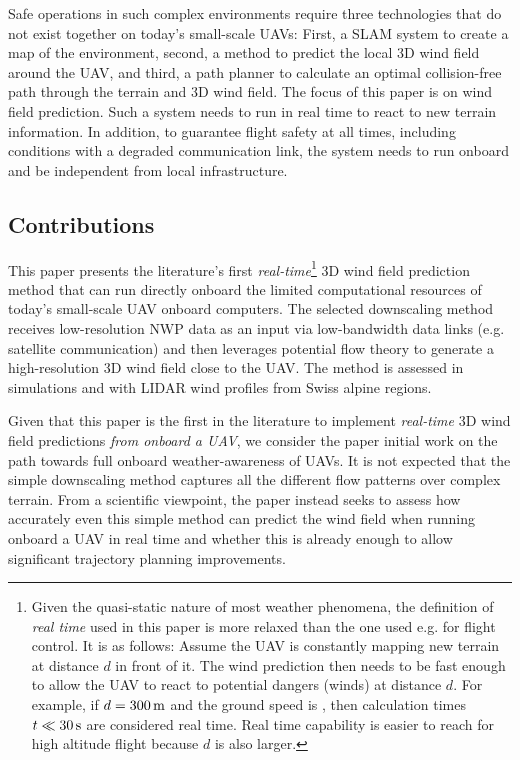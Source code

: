 \documentclass[twocolumn,letterpaper]{IEEEAerospaceCLS}
\begin{document}
Safe operations in such complex environments require three technologies that do not exist together on today's small-scale UAVs: First, a \ac{SLAM} system to create a map of the environment, second, a method to predict the local 3D wind field around the \ac{UAV}, and third, a path planner to calculate an optimal collision-free path through the terrain and 3D wind field. The focus of this paper is on wind field prediction. Such a system needs to run in real time to react to new terrain information. In addition, to guarantee flight safety at all times, including conditions with a degraded communication link, the system needs to run onboard and be independent from local infrastructure.

\subsection{Contributions}
\label{sec:PL_Intro_Contributions}

This paper presents the literature's first \emph{real-time}\footnote{Given the quasi-static nature of most weather phenomena, the definition of \emph{real time} used in this paper is more relaxed than the one used e.g. for flight control. It is as follows: Assume the UAV is constantly mapping new terrain at distance $d$ in front of it. The wind prediction then needs to be fast enough to allow the UAV to react to potential dangers (winds) at distance $d$. For example, if $d=\unit[300]{m}$ and the ground speed is , then calculation times $t\ll\unit[30]{s}$ are considered real time. Real time capability is easier to reach for high altitude flight because $d$ is also larger.} 3D wind field prediction method that can run directly onboard the limited computational resources of today's small-scale \ac{UAV} onboard computers. The selected downscaling method receives low-resolution \ac{NWP} data as an input via low-bandwidth data links (e.g. satellite communication) and then leverages potential flow theory to generate a high-resolution 3D wind field close to the \ac{UAV}. The method is assessed in simulations and with LIDAR wind profiles from Swiss alpine regions.

Given that this paper is the first in the literature to implement \emph{real-time} 3D wind field predictions \emph{from onboard a \ac{UAV}}, we consider the paper initial work on the path towards full onboard weather-awareness of UAVs. It is not expected that the simple downscaling method captures all the different flow patterns over complex terrain. From a scientific viewpoint, the paper instead seeks to assess how accurately even this simple method can predict the wind field when running onboard a \ac{UAV} in real time and whether this is already enough to allow significant trajectory planning improvements.
\end{document}
